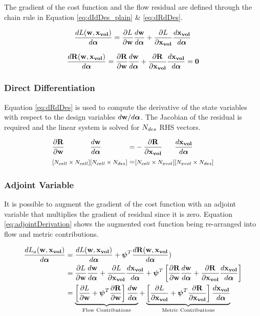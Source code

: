 \documentclass[letterpaper,12pt,]{article}
\begin{document}
The gradient of the cost function and the flow residual are defined through the chain rule in Equation \ref{eq:dIdDes_plain} \& \ref{eq:dRdDes}.

\begin{equation}
	\Dt{L( \bw, \xvol ) } {\balfa}
	= 
    \del{L}{\bw}
	\Dt{\bw}{\balfa}
	+
	\del{L}{\xvol}
	\Dt{\xvol}{\balfa}
	\label{eq:dIdDes_plain}
\end{equation}

\begin{equation}
	\Dt{\bR( \bw, \xvol ) } {\balfa}
	= 
    \del{\bR}{\bw}
	\Dt{\bw}{\balfa}
	+
	\del{\bR}{\xvol}
	\Dt{\xvol}{\balfa}
	=
	\mbf{0}
	\label{eq:dRdDes}
\end{equation}

\subsubsection*{Direct Differentiation}

Equation \ref{eq:dRdDes} is used to compute the derivative of the state variables with respect to the design variables ${d\mathbf{w}}/{d\boldsymbol{\alpha}}$.
The Jacobian of the residual is required and the linear system is solved for $N_{des}$ RHS vectors.

\begin{equation}
\begin{alignedat}{5}
	&\del{\bR}{\bw}
	&&\Dt{\bw}{\balfa}
	&&=
    &&-
	\del{\bR}{\xvol}
	&&\Dt{\xvol}{\balfa}
	\\
	& \smt{\left[ \ncell \times \ncell \right]}
	&&\nxn{\ncell}{\ndes}
	&&=
	&&\nxn{\ncell}{\nxvol}
	&&\nxn{\nxvol}{\ndes}
	\label{eq:dWdDes}
\end{alignedat}
\end{equation}


\subsubsection*{Adjoint Variable}

It is possible to augment the gradient of the cost function with an adjoint variable that multiplies the gradient of residual since it is zero.
Equation \ref{eq:adjointDerivation} shows the augmented cost function being re-arranged into flow and metric contributions.


\begin{equation}
\begin{split}
	\Dt{L_a( \bw, \xvol )}{\balfa} &= 
	\Dt{L( \bw, \xvol )}{\balfa} +
	\bpsi^T
	\Dt{\bR( \bw, \xvol }{\balfa})
\\
	&= 
    \del{L}{\bw}
	\Dt{\bw}{\balfa}
	+
	\del{L}{\xvol}
	\Dt{\xvol}{\balfa}
	+ 
	\bpsi^T
	\sqbr{
		\del{\bR}{\bw}
		\Dt{\bw}{\balfa}
		+
		\del{\bR}{\xvol
	}
	\Dt{\xvol}{\balfa}
	}
\\
	&=
    \underbrace
    {
		\sqbr{
			\del{L}{\bw}
			+
			\bpsi^T
			\del{\bR}{\bw}
		}
		\Dt{\bw}{\balfa}
    }
    _
    {
        \text{Flow Contributions}
    }
	+
    \underbrace
    {
		\sqbr{
			\del{L}{\xvol}
			+
			\bpsi^T
			\del{\bR}{\xvol}
		}
		\Dt{\xvol}{\balfa}
    }
    _
    {
        \text{Metric Contributions}
    }
	\label{eq:adjointDerivation}
\end{split}
\end{equation}
\end{document}
